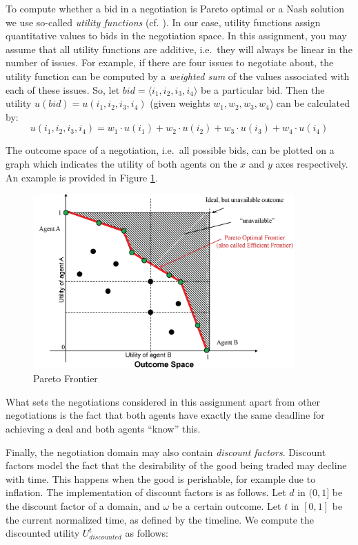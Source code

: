 \documentclass[a4paper]{article}
\begin{document}
To compute whether a bid in a negotiation is Pareto optimal or a Nash solution we use so-called {\em utility functions} (cf. \cite{Rus033rd}). In our case, utility functions assign quantitative values to bids in the negotiation space. In this assignment, you may assume that all utility functions are additive, i.e.\ they will always be linear in the number of issues. For example, if there are four issues to negotiate about, the utility function can be computed by a {\em weighted sum} of the values associated with each of these issues. So, let $bid=\langle i_1,i_2,i_3,i_4\rangle$ be a particular bid. Then the utility $u(bid)=u(i_1,i_2,i_3,i_4)$ (given weights $w_1,w_2,w_3,w_4$) can be calculated by: 
\[
    u(i_1,i_2,i_3,i_4) = w_1\cdot u(i_1)+w_2\cdot u(i_2)+w_3\cdot u(i_3)+w_4\cdot u(i_4)
\]

The outcome space of a negotiation, i.e.\ all possible bids, can be plotted on a graph which indicates the utility of both agents on the $x$ and $y$ axes respectively. An example is provided in Figure \ref{fig:OutcomeSpace}.

\begin{figure}[h]
\centering
\includegraphics[width=10cm]{OutcomeSpace.jpg}
\caption{Pareto Frontier}\label{fig:OutcomeSpace}
\end{figure}

What sets the negotiations considered in this assignment apart from other negotiations is the fact that both agents have exactly the same deadline for achieving a deal and both agents ``know'' this.

Finally, the negotiation domain may also contain \emph{discount factors}. Discount factors model the fact that the desirability of the good being traded may decline with time. This happens when the good is perishable, for example due to inflation. The implementation of discount factors is as follows. Let $d$ in $(0, 1]$ be the discount factor of a domain, and $\omega$ be a certain outcome. Let $t$ in $[0, 1]$ be the current normalized time, as defined by the timeline. We compute the discounted utility $U_{discounted}^t$ as follows:
\end{document}
